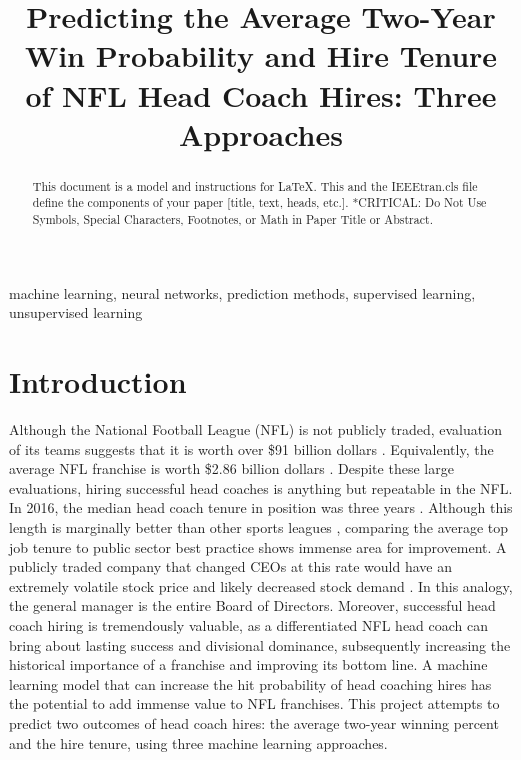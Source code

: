 \documentclass[conference]{IEEEtran}
\begin{document}
\title{Predicting the Average Two-Year Win Probability and Hire Tenure of NFL Head Coach Hires: Three Approaches}

\author{
}

\maketitle

\begin{abstract}
This document is a model and instructions for \LaTeX.
This and the IEEEtran.cls file define the components of your paper [title, text, heads, etc.]. *CRITICAL: Do Not Use Symbols, Special Characters, Footnotes, 
or Math in Paper Title or Abstract.
\end{abstract}

\begin{IEEEkeywords}
machine learning, neural networks, prediction methods, supervised learning, unsupervised learning
\end{IEEEkeywords}

\section{Introduction}
Although the National Football League (NFL) is not publicly traded, evaluation of its teams suggests that it is worth over \$91 billion dollars \cite{b1}.  Equivalently, the average NFL franchise is worth \$2.86 billion dollars \cite{b1}. Despite these large evaluations, hiring successful head coaches is anything but repeatable in the NFL. In 2016, the median head coach tenure in position was three years \cite{b2}. Although this length is marginally better than other sports leagues \cite{b2}, comparing the average top job tenure to public sector best practice shows immense area for improvement. A publicly traded company that changed CEOs at this rate would have an extremely volatile stock price and likely decreased stock demand \cite{b3}. In this analogy, the general manager is the entire Board of Directors. Moreover, successful head coach hiring is tremendously valuable, as a differentiated NFL head coach can bring about lasting success and divisional dominance, subsequently increasing the historical importance of a franchise and improving its bottom line. A machine learning model that can increase the hit probability of head coaching hires has the potential to add immense value to NFL franchises. This project attempts to predict two outcomes of head coach hires: the average two-year winning percent and the hire tenure, using three machine learning approaches.
\end{document}
